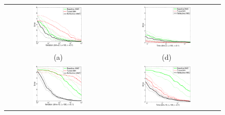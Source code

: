\documentclass{article} %
\begin{document}
\begin{figure}[t!]
\label{fig:results}
\vspace{-1mm}
\begin{center}
\begin{tabular}{cc}
   \hspace{-5mm} \includegraphics[width=0.49\textwidth,height=0.37\textwidth]{plots1/expectationVsamples_dim2.pdf} 
& \hspace{-3mm} \includegraphics[width=0.49\textwidth,height=0.37\textwidth]{plots1/expectationVtime_dim2.pdf} 
\vspace{-1.5mm}
\\
   \hspace{-5mm} \footnotesize(a) 
& \hspace{-4mm} \footnotesize(d) 
\\
\hspace{-5mm} \includegraphics[width=0.49\textwidth,height=0.37\textwidth]{plots1/expectationVsamples_dim10.pdf} 
& \hspace{-3mm} \includegraphics[width=0.49\textwidth,height=0.37\textwidth]{plots1/expectationVtime_dim10.pdf} 

\end{tabular}
\end{center}
\end{figure}
\end{document}
